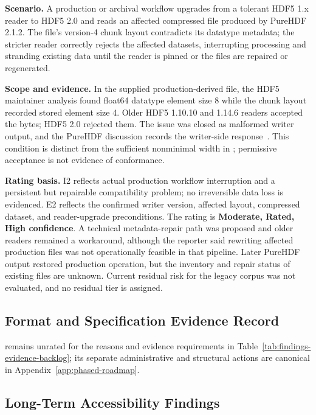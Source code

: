 \documentclass[../main.tex]{subfiles}
\begin{document}
\noindent\textbf{Scenario.}
A production or archival workflow upgrades from a tolerant HDF5 1.x reader to
HDF5 2.0 and reads an affected compressed file produced by PureHDF 2.1.2. The
file's version-4 chunk layout contradicts its datatype metadata; the stricter
reader correctly rejects the affected datasets, interrupting processing and
stranding existing data until the reader is pinned or the files are repaired or
regenerated.

\noindent\textbf{Scope and evidence.}
In the supplied production-derived file, the HDF5 maintainer analysis found
float64 datatype element size 8 while the chunk layout recorded stored element
size 4. Older HDF5 1.10.10 and 1.14.6 readers accepted the bytes; HDF5 2.0
rejected them. The issue was closed as malformed writer output, and the PureHDF
discussion records the writer-side response~\cite{hdf5-gh-issue-6534,purehdf-gh-issue-164}.
This condition is distinct from the sufficient nonminimal width in
; permissive acceptance is not evidence of conformance.

\noindent\textbf{Rating basis.}
I2 reflects actual production workflow interruption and a persistent but
repairable compatibility problem; no irreversible data loss is evidenced. E2
reflects the confirmed writer version, affected layout, compressed dataset, and
reader-upgrade preconditions. The rating is \textbf{Moderate, Rated, High
confidence}. A technical metadata-repair path was proposed and older readers
remained a workaround, although the reporter said rewriting affected production
files was not operationally feasible in that pipeline. Later PureHDF output
restored production operation, but the inventory and repair status of existing
files are unknown. Current residual risk for the legacy corpus was not
evaluated, and no residual tier is assigned.

\subsection{Format and Specification Evidence Record}

 remains unrated for the reasons and evidence requirements in
Table~\ref{tab:findings-evidence-backlog}; its separate administrative and
structural actions are canonical in Appendix~\ref{app:phased-roadmap}.

\subsection{Long-Term Accessibility Findings}
\end{document}
